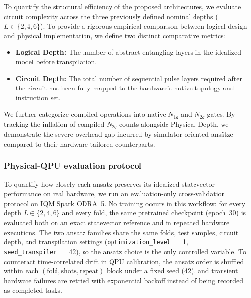 \documentclass[11pt]{article}
\begin{document}
To quantify the structural efficiency of the proposed architectures, we evaluate circuit complexity across the three previously defined nominal depths ($L \in \{2, 4, 6\}$). To provide a rigorous empirical comparison between logical design and physical implementation, we define two distinct comparative metrics:
\begin{itemize}
    \item \textbf{Logical Depth:} The number of abstract entangling layers in the idealized model before transpilation.
    \item \textbf{Circuit Depth:} The total number of sequential pulse layers required after the circuit has been fully mapped to the hardware's native topology and instruction set.
\end{itemize}
We further categorize compiled operations into native $N_{1q}$ and $N_{2q}$ gates. By tracking the inflation of compiled $N_{2q}$ counts alongside Physical Depth, we demonstrate the severe overhead gap incurred by simulator-oriented ansätze compared to their hardware-tailored counterparts.

\subsubsection{Physical-QPU evaluation protocol}

To quantify how closely each ansatz preserves its idealized statevector performance on real hardware, we run an evaluation-only cross-validation protocol on IQM Spark ODRA~5. No training occurs in this workflow: for every depth $L \in \{2, 4, 6\}$ and every fold, the same pretrained checkpoint (epoch~30) is evaluated both on an exact statevector reference and in repeated hardware executions. The two ansatz families share the same folds, test samples, circuit depth, and transpilation settings (\texttt{optimization\_level}~=~1, \texttt{seed\_transpiler}~=~42), so the ansatz choice is the only controlled variable. To counteract time-correlated drift in QPU calibration, the ansatz order is shuffled within each $(\text{fold}, \text{shots}, \text{repeat})$ block under a fixed seed (42), and transient hardware failures are retried with exponential backoff instead of being recorded as completed tasks.
\end{document}

